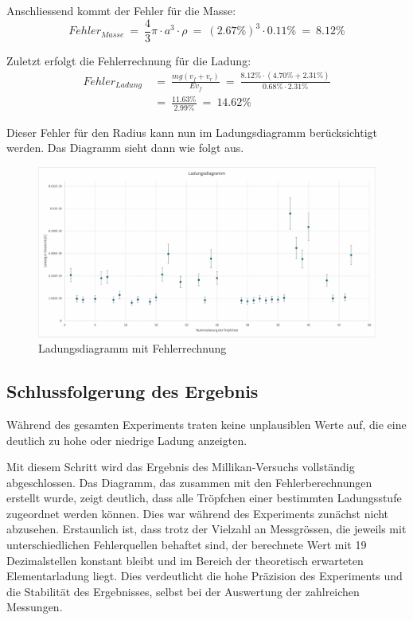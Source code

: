 \noindent Anschliessend kommt der Fehler für die Masse:
\begin{equation*}\label{eq:fehlerMasse}
	Fehler_{Masse} \ = \ \frac{4}{3} \pi \cdot a^3 \cdot \rho \ = \ (2.67\%)^3 \cdot 0.11\% \ = \ 8.12\%
\end{equation*}

\noindent Zuletzt erfolgt die Fehlerrechnung für die Ladung:
\begin{equation*}
	\begin{split}
		Fehler_{Ladung} & \ = \ \frac{mg(v_f + v_r)}{Ev_f} \ = \ \frac{8.12\% \cdot (4.70\% + 2.31\%)}{0.68\% \cdot 2.31\%} \\
		& \ = \ \frac{11.63\%}{2.99\%} \ = \ 14.62\%	
	\end{split}
\end{equation*}

\noindent Dieser Fehler für den Radius kann nun im Ladungsdiagramm berücksichtigt werden. Das Diagramm sieht dann wie folgt aus.

\begin{figure}[h]
	\centering
	\includegraphics[width=\textwidth]{bilder/pdf/LadungsdiagrammMitNeu.pdf}
	\caption{Ladungsdiagramm mit Fehlerrechnung}
	\label{fig:ladungsdiagrammMFehlerrechnung}
\end{figure}

\subsection{Schlussfolgerung des Ergebnis}\label{sub:schlussfolgerung}
Während des gesamten Experiments traten keine unplausiblen Werte auf, die eine deutlich zu hohe oder niedrige Ladung anzeigten. 

Mit diesem Schritt wird das Ergebnis des Millikan-Versuchs vollständig abgeschlossen. Das Diagramm, das zusammen mit den Fehlerberechnungen erstellt wurde, zeigt deutlich, dass alle Tröpfchen einer bestimmten Ladungsstufe zugeordnet werden können. Dies war während des Experiments zunächst nicht abzusehen. Erstaunlich ist, dass trotz der Vielzahl an Messgrössen, die jeweils mit unterschiedlichen Fehlerquellen behaftet sind, der berechnete Wert mit 19 Dezimalstellen konstant bleibt und im Bereich der theoretisch erwarteten Elementarladung liegt. Dies verdeutlicht die hohe Präzision des Experiments und die Stabilität des Ergebnisses, selbst bei der Auswertung der zahlreichen Messungen. \\

